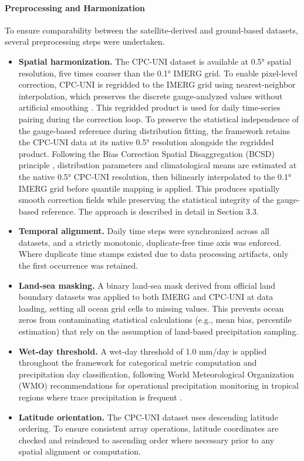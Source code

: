 \documentclass[remotesensing,article,submit,pdftex,moreauthors]{Definitions/mdpi}
\begin{document}
\paragraph{Preprocessing and
Harmonization}\label{preprocessing-and-harmonization}

To ensure comparability between the satellite-derived and ground-based
datasets, several preprocessing steps were undertaken.

\begin{itemize}
\item
  \textbf{Spatial harmonization.} The CPC-UNI dataset is available at
  0.5° spatial resolution, five times coarser than the 0.1° IMERG grid.
  To enable pixel-level correction, CPC-UNI is regridded to the IMERG
  grid using nearest-neighbor interpolation, which preserves the
  discrete gauge-analyzed values without artificial smoothing \cite{ref13}.
  This regridded product is used for daily time-series pairing during
  the correction loop. To preserve the statistical independence of the
  gauge-based reference during distribution fitting, the framework
  retains the CPC-UNI data at its native 0.5° resolution alongside the
  regridded product. Following the Bias Correction Spatial
  Disaggregation (BCSD) principle \cite{ref23}, distribution parameters and
  climatological means are estimated at the native 0.5° CPC-UNI
  resolution, then bilinearly interpolated to the 0.1° IMERG grid before
  quantile mapping is applied. This produces spatially smooth correction
  fields while preserving the statistical integrity of the gauge-based
  reference. The approach is described in detail in Section 3.3.
\item
  \textbf{Temporal alignment.} Daily time steps were synchronized across
  all datasets, and a strictly monotonic, duplicate-free time axis was
  enforced. Where duplicate time stamps existed due to data processing
  artifacts, only the first occurrence was retained.
\item
  \textbf{Land-sea masking.} A binary land-sea mask derived from
  official land boundary datasets was applied to both IMERG and CPC-UNI
  at data loading, setting all ocean grid cells to missing values. This
  prevents ocean zeros from contaminating statistical calculations
  (e.g., mean bias, percentile estimation) that rely on the assumption
  of land-based precipitation sampling.
\item
  \textbf{Wet-day threshold.} A wet-day threshold of 1.0 mm/day is
  applied throughout the framework for categorical metric computation
  and precipitation day classification, following World Meteorological
  Organization (WMO) recommendations for operational precipitation
  monitoring in tropical regions where trace precipitation is frequent
  \cite{ref24}.
\item
  \textbf{Latitude orientation.} The CPC-UNI dataset uses descending
  latitude ordering. To ensure consistent array operations, latitude
  coordinates are checked and reindexed to ascending order where
  necessary prior to any spatial alignment or computation.
\end{itemize}
\end{document}
